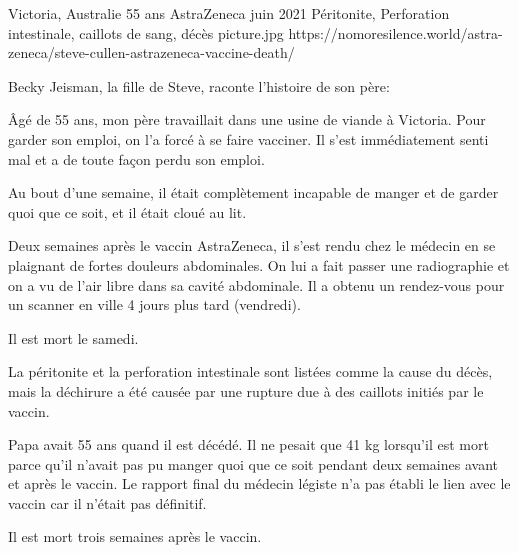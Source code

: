 {Victoria, Australie}
{55 ans}
{AstraZeneca}
{juin 2021}
{Péritonite, Perforation intestinale, caillots de sang, décès}
{picture.jpg}
{https://nomoresilence.world/astra-zeneca/steve-cullen-astrazeneca-vaccine-death/}
{

Becky Jeisman, la fille de Steve, raconte l'histoire de son père:

Âgé de 55 ans, mon père travaillait dans une usine de viande à Victoria. Pour
garder son emploi, on l'a forcé à se faire vacciner. Il s'est immédiatement
senti mal et a de toute façon perdu son emploi.

Au bout d'une semaine, il était complètement incapable de manger et de garder
quoi que ce soit, et il était cloué au lit.

Deux semaines après le vaccin AstraZeneca, il s'est rendu chez le médecin en se
plaignant de fortes douleurs abdominales. On lui a fait passer une radiographie
et on a vu de l'air libre dans sa cavité abdominale. Il a obtenu un rendez-vous
pour un scanner en ville 4 jours plus tard (vendredi).

Il est mort le samedi.

La péritonite et la perforation intestinale sont listées comme la cause du
décès, mais la déchirure a été causée par une rupture due à des caillots initiés
par le vaccin.

Papa avait 55 ans quand il est décédé. Il ne pesait que 41 kg lorsqu'il est mort
parce qu'il n'avait pas pu manger quoi que ce soit pendant deux semaines avant
et après le vaccin. Le rapport final du médecin légiste n'a pas établi le lien
avec le vaccin car il n'était pas définitif.

Il est mort trois semaines après le vaccin.

}
